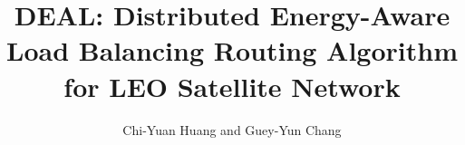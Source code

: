 \documentclass[journal, compsoc, 10pt]{IEEEtran}
\begin{document}
\title{DEAL: Distributed Energy-Aware Load Balancing Routing Algorithm for LEO Satellite Network}
\author{Chi-Yuan Huang and Guey-Yun Chang}


\maketitle









%
\end{document}
